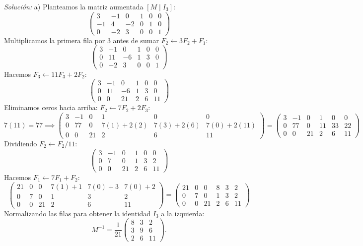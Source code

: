 \documentclass[11pt,letterpaper]{article}
\theoremstyle{definition}
\theoremstyle{plain}
\begin{document}
\emph{Solución:}
a) Planteamos la matriz aumentada $[M \mid I_3]$:
\[
\left(\begin{array}{ccc|ccc}
3 & -1 & 0 & 1 & 0 & 0 \\
-1 & 4 & -2 & 0 & 1 & 0 \\
0 & -2 & 3 & 0 & 0 & 1
\end{array}\right)
\]
Multiplicamos la primera fila por 3 antes de sumar $F_2 \leftarrow 3F_2 + F_1$:
\[
\left(\begin{array}{ccc|ccc}
3 & -1 & 0 & 1 & 0 & 0 \\
0 & 11 & -6 & 1 & 3 & 0 \\
0 & -2 & 3 & 0 & 0 & 1
\end{array}\right)
\]
Hacemos $F_3 \leftarrow 11F_3 + 2F_2$:
\[
\left(\begin{array}{ccc|ccc}
3 & -1 & 0 & 1 & 0 & 0 \\
0 & 11 & -6 & 1 & 3 & 0 \\
0 & 0 & 21 & 2 & 6 & 11
\end{array}\right)
\]
Eliminamos ceros hacia arriba: $F_2 \leftarrow 7F_2 + 2F_3$:
\[
7(11) = 77 \implies \left(\begin{array}{ccc|ccc}
3 & -1 & 0 & 1 & 0 & 0 \\
0 & 77 & 0 & 7(1)+2(2) & 7(3)+2(6) & 7(0)+2(11) \\
0 & 0 & 21 & 2 & 6 & 11
\end{array}\right) = \left(\begin{array}{ccc|ccc}
3 & -1 & 0 & 1 & 0 & 0 \\
0 & 77 & 0 & 11 & 33 & 22 \\
0 & 0 & 21 & 2 & 6 & 11
\end{array}\right)
\]
Dividiendo $F_2 \leftarrow F_2 / 11$:
\[
\left(\begin{array}{ccc|ccc}
3 & -1 & 0 & 1 & 0 & 0 \\
0 & 7 & 0 & 1 & 3 & 2 \\
0 & 0 & 21 & 2 & 6 & 11
\end{array}\right)
\]
Hacemos $F_1 \leftarrow 7F_1 + F_2$:
\[
\left(\begin{array}{ccc|ccc}
21 & 0 & 0 & 7(1)+1 & 7(0)+3 & 7(0)+2 \\
0 & 7 & 0 & 1 & 3 & 2 \\
0 & 0 & 21 & 2 & 6 & 11
\end{array}\right) = \left(\begin{array}{ccc|ccc}
21 & 0 & 0 & 8 & 3 & 2 \\
0 & 7 & 0 & 1 & 3 & 2 \\
0 & 0 & 21 & 2 & 6 & 11
\end{array}\right)
\]
Normalizando las filas para obtener la identidad $I_3$ a la izquierda:
\[
M^{-1} = \frac{1}{21} \begin{pmatrix} 8 & 3 & 2 \\ 3 & 9 & 6 \\ 2 & 6 & 11 \end{pmatrix}.
\]
\end{document}

